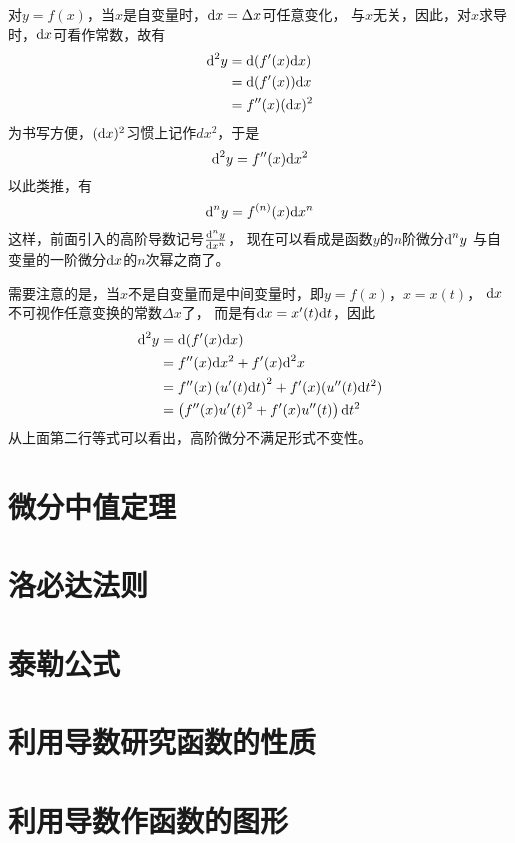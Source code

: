 对$y=f(x)$，当$x$是自变量时，$\textrm{d} x = \Delta x$可任意变化，
与$x$无关，因此，对$x$求导时，$\textrm{d} x$可看作常数，故有
\begin{align*}
  \textrm{d}^2 y
  &= \textrm{d}(f'(x)\textrm{d} x) \\
  &= \textrm{d}(f'(x))\textrm{d} x \\
  &= f''(x)(\textrm{d} x)^2
\end{align*}
为书写方便，$(\textrm{d} x)^2$习惯上记作$dx^2$，于是
\begin{displaymath}
  \textrm{d}^2 y = f''(x)\textrm{d} x^2
\end{displaymath}
以此类推，有
\begin{displaymath}
  \textrm{d}^n y = f^{(n)}(x) \textrm{d} x^n
\end{displaymath}
这样，前面引入的高阶导数记号$\frac{\textrm{d}^n y}{\textrm{d} x^n}$，
现在可以看成是函数$y$的$n$阶微分$\textrm{d}^n y$
与自变量的一阶微分$\textrm{d} x$的$n$次幂之商了。

需要注意的是，当$x$不是自变量而是中间变量时，即$y=f(x)$，$x=x(t)$，
$\textrm{d} x$不可视作任意变换的常数$\Delta x$了，
而是有$\textrm{d} x = x'(t)\textrm{d} t$，因此
\begin{align*}
  \textrm{d}^2 y
  &= \textrm{d} (f'(x)\textrm{d} x) \\
  &= f''(x)\textrm{d} x^2 + f'(x)\textrm{d}^2 x \\
  &= f''(x)\left(u'(t)\textrm{d} t\right)^2 + f'(x)(u''(t)\textrm{d} t^2)\\
  &= \left(f''(x)u'(t)^2 + f'(x)u''(t)\right)\textrm{d} t^2
\end{align*}
从上面第二行等式可以看出，高阶微分不满足形式不变性。

\section{微分中值定理}

\section{洛必达法则}

\section{泰勒公式}

\section{利用导数研究函数的性质}

\section{利用导数作函数的图形}
